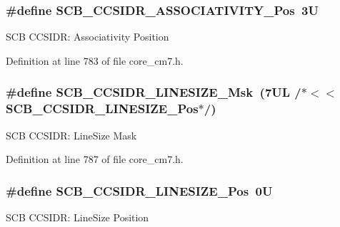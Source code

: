 \subsubsection[{\texorpdfstring{S\+C\+B\+\_\+\+C\+C\+S\+I\+D\+R\+\_\+\+A\+S\+S\+O\+C\+I\+A\+T\+I\+V\+I\+T\+Y\+\_\+\+Pos}{SCB_CCSIDR_ASSOCIATIVITY_Pos}}]{\setlength{\rightskip}{0pt plus 5cm}\#define S\+C\+B\+\_\+\+C\+C\+S\+I\+D\+R\+\_\+\+A\+S\+S\+O\+C\+I\+A\+T\+I\+V\+I\+T\+Y\+\_\+\+Pos~3U}\hypertarget{group___c_m_s_i_s___s_c_b_gae67f2f83976b819fb3039fc35cfef0fb}{}\label{group___c_m_s_i_s___s_c_b_gae67f2f83976b819fb3039fc35cfef0fb}
S\+CB C\+C\+S\+I\+DR\+: Associativity Position 

Definition at line 783 of file core\+\_\+cm7.\+h.

\subsubsection[{\texorpdfstring{S\+C\+B\+\_\+\+C\+C\+S\+I\+D\+R\+\_\+\+L\+I\+N\+E\+S\+I\+Z\+E\+\_\+\+Msk}{SCB_CCSIDR_LINESIZE_Msk}}]{\setlength{\rightskip}{0pt plus 5cm}\#define S\+C\+B\+\_\+\+C\+C\+S\+I\+D\+R\+\_\+\+L\+I\+N\+E\+S\+I\+Z\+E\+\_\+\+Msk~(7\+U\+L /$\ast$$<$$<$ S\+C\+B\+\_\+\+C\+C\+S\+I\+D\+R\+\_\+\+L\+I\+N\+E\+S\+I\+Z\+E\+\_\+\+Pos$\ast$/)}\hypertarget{group___c_m_s_i_s___s_c_b_ga07b3bdffe4c289b9c19c70cf698499da}{}\label{group___c_m_s_i_s___s_c_b_ga07b3bdffe4c289b9c19c70cf698499da}
S\+CB C\+C\+S\+I\+DR\+: Line\+Size Mask 

Definition at line 787 of file core\+\_\+cm7.\+h.

\subsubsection[{\texorpdfstring{S\+C\+B\+\_\+\+C\+C\+S\+I\+D\+R\+\_\+\+L\+I\+N\+E\+S\+I\+Z\+E\+\_\+\+Pos}{SCB_CCSIDR_LINESIZE_Pos}}]{\setlength{\rightskip}{0pt plus 5cm}\#define S\+C\+B\+\_\+\+C\+C\+S\+I\+D\+R\+\_\+\+L\+I\+N\+E\+S\+I\+Z\+E\+\_\+\+Pos~0U}\hypertarget{group___c_m_s_i_s___s_c_b_ga750388e1509b36d35568a68a7a1e1ff7}{}\label{group___c_m_s_i_s___s_c_b_ga750388e1509b36d35568a68a7a1e1ff7}
S\+CB C\+C\+S\+I\+DR\+: Line\+Size Position 

